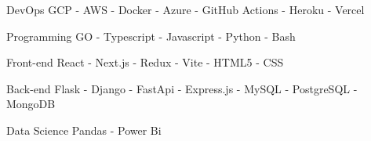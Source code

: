 

\begin{cvskills}

  \cvskill
    {DevOps} %
    {GCP - AWS - Docker - Azure - GitHub Actions - Heroku - Vercel} %

  \cvskill
    {Programming} %
    {GO - Typescript - Javascript - Python - Bash} %

  \cvskill
      {Front-end} %
      {React - Next.js - Redux - Vite - HTML5 - CSS} %

  \cvskill
    {Back-end} %
    {Flask - Django - FastApi - Express.js -  MySQL - PostgreSQL - MongoDB} %

  \cvskill
    {Data Science} %
    {Pandas - Power Bi} %

\end{cvskills}
